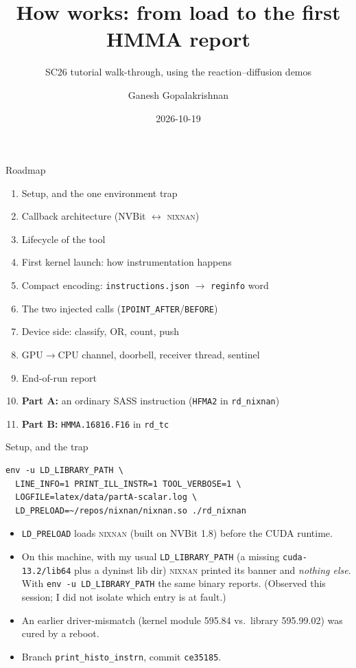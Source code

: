 \documentclass[aspectratio=169,10pt]{beamer}
\title{How \nn{} works: from load to the first HMMA report}
\subtitle{SC26 tutorial walk-through, using the reaction--diffusion demos}
\author{Ganesh Gopalakrishnan}
\date{2026-10-19}
\newcommand{\nn}{\textsc{nixnan}}
\begin{document}
\maketitle

\begin{frame}{Roadmap}
\begin{enumerate}\small
\item Setup, and the one environment trap
\item Callback architecture (NVBit $\leftrightarrow$ \nn)
\item Lifecycle of the tool
\item First kernel launch: how instrumentation happens
\item Compact encoding: \texttt{instructions.json} $\to$ \texttt{reginfo} word
\item The two injected calls (\texttt{IPOINT\_AFTER}/\texttt{BEFORE})
\item Device side: classify, OR, count, push
\item GPU$\to$CPU channel, doorbell, receiver thread, sentinel
\item End-of-run report
\item \textbf{Part A:} an ordinary SASS instruction (\texttt{HFMA2} in \texttt{rd\_nixnan})
\item \textbf{Part B:} \texttt{HMMA.16816.F16} in \texttt{rd\_tc}
\end{enumerate}
\end{frame}

\begin{frame}[fragile]{Setup, and the trap}
\begin{lstlisting}
env -u LD_LIBRARY_PATH \
  LINE_INFO=1 PRINT_ILL_INSTR=1 TOOL_VERBOSE=1 \
  LOGFILE=latex/data/partA-scalar.log \
  LD_PRELOAD=~/repos/nixnan/nixnan.so ./rd_nixnan
\end{lstlisting}
\begin{itemize}\small
\item \texttt{LD\_PRELOAD} loads \nn{} (built on NVBit 1.8) before the CUDA runtime.
\item On this machine, with my usual \texttt{LD\_LIBRARY\_PATH} (a missing \texttt{cuda-13.2/lib64} plus a dyninst lib dir) \nn{} printed its banner and \emph{nothing else}. With \texttt{env -u LD\_LIBRARY\_PATH} the same binary reports. (Observed this session; I did not isolate which entry is at fault.)
\item An earlier driver-mismatch (kernel module 595.84 vs.\ library 595.99.02) was cured by a reboot.
\item Branch \texttt{print\_histo\_instrn}, commit \texttt{ce35185}.
\end{itemize}
\end{frame}
\end{document}
